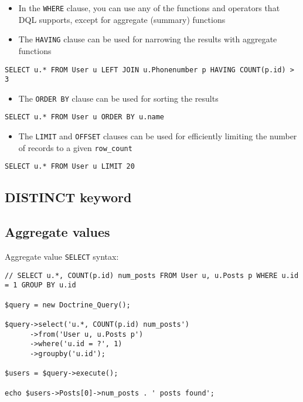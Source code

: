 \documentclass[11pt,a4paper]{report}
\begin{document}
\begin{itemize}
\item{In the \texttt{WHERE} clause, you can use any of the functions and operators that DQL supports, except for aggregate (summary) functions}
\item{The \texttt{HAVING} clause can be used for narrowing the results with aggregate functions}
\end{itemize}
\begin{verbatim}
SELECT u.* FROM User u LEFT JOIN u.Phonenumber p HAVING COUNT(p.id) > 3
\end{verbatim}

\begin{itemize}
\item{The \texttt{ORDER BY} clause can be used for sorting the results}
\end{itemize}
\begin{verbatim}
SELECT u.* FROM User u ORDER BY u.name
\end{verbatim}

\begin{itemize}
\item{The \texttt{LIMIT} and \texttt{OFFSET} clauses can be used for efficiently limiting the number of records to a given \texttt{row\_count}}
\end{itemize}
\begin{verbatim}
SELECT u.* FROM User u LIMIT 20
\end{verbatim}

\subsection{DISTINCT keyword}
\subsection{Aggregate values}
Aggregate value \texttt{SELECT} syntax:

\begin{verbatim}
// SELECT u.*, COUNT(p.id) num_posts FROM User u, u.Posts p WHERE u.id = 1 GROUP BY u.id

$query = new Doctrine_Query();

$query->select('u.*, COUNT(p.id) num_posts')
      ->from('User u, u.Posts p')
      ->where('u.id = ?', 1)
      ->groupby('u.id');

$users = $query->execute();

echo $users->Posts[0]->num_posts . ' posts found';
\end{verbatim}
\end{document}

